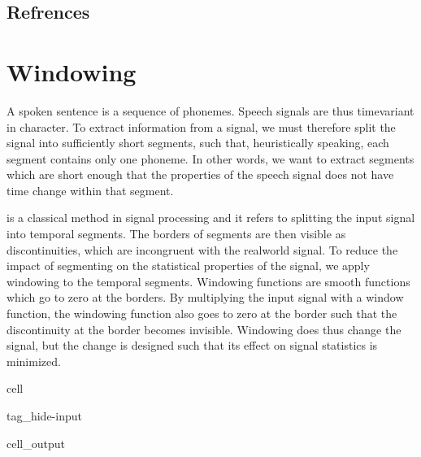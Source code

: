 \documentclass[letterpaper,10pt,english]{jupyterBook}
\begin{document}
\subsection{Refrences}
\label{\detokenize{Representations/Waveform:refrences}}
\sphinxstepscope


\section{Windowing}
\label{\detokenize{Representations/Windowing:windowing}}\label{\detokenize{Representations/Windowing::doc}}
\sphinxAtStartPar
{}

\sphinxAtStartPar
A spoken sentence is a sequence of phonemes. Speech signals are thus
time\sphinxhyphen{}variant in character. To extract information from a signal, we must
therefore split the signal into sufficiently short segments, such that,
heuristically speaking, each segment contains only one phoneme. In other
words, we want to extract segments which are short enough that the
properties of the speech signal does not have time change within that
segment.

\sphinxAtStartPar
{} is a classical method in signal processing and it refers to
splitting the input signal into temporal segments. The borders of
segments are then visible as discontinuities, which are incongruent with
the real\sphinxhyphen{}world signal. To reduce the impact of segmenting on the
statistical properties of the signal, we apply windowing to the temporal
segments. Windowing functions are smooth functions which go to zero at
the borders. By multiplying the input signal with a window function, the
windowing function also goes to zero at the border such that the
discontinuity at the border becomes invisible. Windowing does thus
change the signal, but the change is designed such that its effect on
signal statistics is minimized.

\begin{sphinxuseclass}{cell}
\begin{sphinxuseclass}{tag_hide-input}\begin{sphinxVerbatimOutput}

\begin{sphinxuseclass}{cell_output}
\noindent{}

\noindent{}

\noindent{}

\end{sphinxuseclass}\end{sphinxVerbatimOutput}

\end{sphinxuseclass}
\end{sphinxuseclass}
\end{document}
